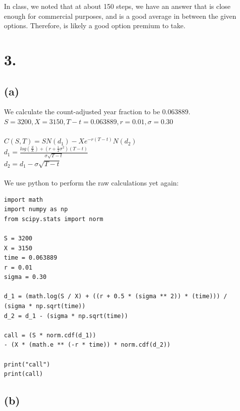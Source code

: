\documentclass{article}
\begin{document}
{%

In class, we noted that at about 150 steps, we have an answer that is close enough for commercial purposes, and is a good average in between the given options. Therefore,  is likely a good option premium to take.

\newpage
}

\section*{3.}
{\Large 

\subsection*{(a)}

We calculate the count-adjusted year fraction to be $0.063889$. \\
$S = 3200, X = 3150, T-t = 0.063889, r = 0.01, \sigma = 0.30$ \\ \\
$C(S, T) = SN(d_1) - Xe^{-r(T-t)}N(d_2)$ \\
$d_1 = \frac{log(\frac{S}{X}) + (r+\frac{1}{2}\sigma^2)(T-t)}{\sigma\sqrt{T-t}}$ \\
$d_2 = d_1 - \sigma\sqrt{T-t}$ \\ \\
We use python to perform the raw calculations yet again:
\begin{verbatim}
import math
import numpy as np
from scipy.stats import norm

S = 3200
X = 3150
time = 0.063889
r = 0.01
sigma = 0.30

d_1 = (math.log(S / X) + ((r + 0.5 * (sigma ** 2)) * (time))) / 
(sigma * np.sqrt(time))
d_2 = d_1 - (sigma * np.sqrt(time))

call = (S * norm.cdf(d_1)) 
- (X * (math.e ** (-r * time)) * norm.cdf(d_2))

print("call")
print(call)
\end{verbatim}

\subsection*{(b)}

}
\end{document}
